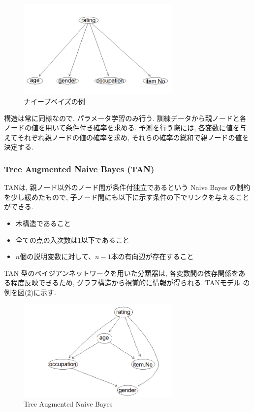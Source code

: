 \documentclass[a4paper]{jarticle}
\begin{document}
\begin{figure}[H]
 \begin{center}
  \includegraphics[width=80mm]{data/sample1.png}
 \end{center}
 \caption{ナイーブベイズの例}
 \label{naive}
\end{figure}

構造は常に同様なので, パラメータ学習のみ行う. 訓練データから親ノードと各ノードの値を用いて条件付き確率を求める. 予測を行う際には, 各変数に値を与えてそれぞれ親ノードの値の確率を求め, それらの確率の総和で親ノードの値を決定する.

\subsubsection{Tree Augmented Naive Bayes (TAN)}

TANは, 親ノード以外のノード間が条件付独立であるという Naive Bayes の制約を少し緩めたもので, 子ノード間にも以下に示す条件の下でリンクを与えることができる.\citep{Friedman}

\begin{itemize}
\item 木構造であること

\item 全ての点の入次数は1以下であること

\item $n$個の説明変数に対して、$n-1$本の有向辺が存在すること
\end{itemize}

TAN 型のベイジアンネットワークを用いた分類器は, 各変数間の依存関係をある程度反映できるため, グラフ構造から視覚的に情報が得られる. TANモデル の例を図(\ref{TAN})に示す.

\begin{figure}[H]
 \begin{center}
  \includegraphics[width=80mm]{data/sample2.png}
 \end{center}
 \caption{Tree Augmented Naive Bayes}
 \label{TAN}
\end{figure}
\end{document}
